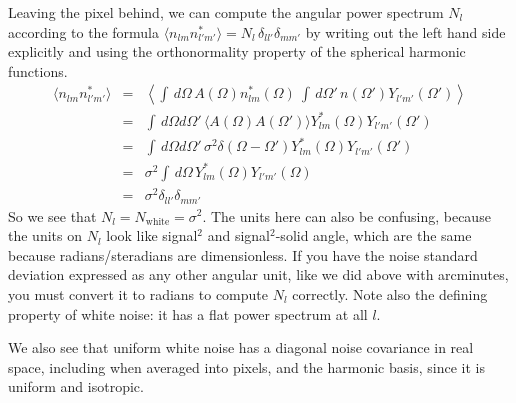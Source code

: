 Leaving the pixel behind, we can compute the angular power spectrum $N_l$ according to the formula $\langle n_{lm} n^*_{l'm'} \rangle = N_l\, \delta_{ll'}\delta_{mm'}$ by writing out the left hand side explicitly and using the orthonormality property of the spherical harmonic functions.
\begin{eqnarray}
\langle n_{lm} n^*_{l'm'} \rangle &=& \left\langle  \int \,d\Omega\, A(\Omega)  n^*_{lm}(\Omega) \  \int \,d\Omega'\, n(\Omega')  Y_{l'm'}(\Omega')  \right\rangle \nonumber \\
&=&  \int \,d\Omega d\Omega'\, \langle A(\Omega) A(\Omega') \rangle  Y^*_{lm}(\Omega)  Y_{l'm'}(\Omega') \nonumber \\
&=&  \int \,d\Omega d\Omega'\,  \sigma^2 \delta(\Omega - \Omega')  Y^*_{lm}(\Omega)  Y_{l'm'}(\Omega') \nonumber \\
&=&  \sigma^2   \int \,d\Omega \,  Y^*_{lm}(\Omega)  Y_{l'm'}(\Omega) \nonumber \\
&=& \sigma^2 \delta_{ll'}\delta_{mm'}
\end{eqnarray}
So we see that $N_l = N_\textrm{white}= \sigma^2$.
The units here can also be confusing, because the units on $N_l$ look like signal${}^2$ and signal$^2$-solid angle, which are the same because radians/steradians are dimensionless.  If you have the noise standard deviation
expressed as any other angular unit, like we did above with arcminutes, you must convert it to radians to compute $N_l$ correctly.  Note also the defining property of white noise: it has a flat power spectrum at all $l$.

We also see that uniform white noise has a diagonal noise covariance in real space, including when averaged into pixels, and the harmonic basis, since it is uniform and isotropic.

